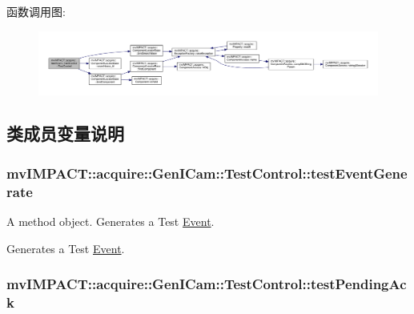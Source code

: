 函数调用图\+:
\nopagebreak
\begin{figure}[H]
\begin{center}
\leavevmode
\includegraphics[width=350pt]{classmv_i_m_p_a_c_t_1_1acquire_1_1_gen_i_cam_1_1_test_control_afd41927585e38b0b140faa80b78e6a55_cgraph}
\end{center}
\end{figure}




\subsection{类成员变量说明}
\hypertarget{classmv_i_m_p_a_c_t_1_1acquire_1_1_gen_i_cam_1_1_test_control_a38ed61ff2ddbc080ea27776b3b4da928}{
\subsubsection[{test\+Event\+Generate}]{ mv\+I\+M\+P\+A\+C\+T\+::acquire\+::\+Gen\+I\+Cam\+::\+Test\+Control\+::test\+Event\+Generate}}\label{classmv_i_m_p_a_c_t_1_1acquire_1_1_gen_i_cam_1_1_test_control_a38ed61ff2ddbc080ea27776b3b4da928}


A method object. Generates a Test \hyperlink{classmv_i_m_p_a_c_t_1_1acquire_1_1_event}{Event}. 

Generates a Test \hyperlink{classmv_i_m_p_a_c_t_1_1acquire_1_1_event}{Event}. \hypertarget{classmv_i_m_p_a_c_t_1_1acquire_1_1_gen_i_cam_1_1_test_control_aab450f8b92bc80b59be8a60c364e0695}{
\subsubsection[{test\+Pending\+Ack}]{ mv\+I\+M\+P\+A\+C\+T\+::acquire\+::\+Gen\+I\+Cam\+::\+Test\+Control\+::test\+Pending\+Ack}}\label{classmv_i_m_p_a_c_t_1_1acquire_1_1_gen_i_cam_1_1_test_control_aab450f8b92bc80b59be8a60c364e0695}


